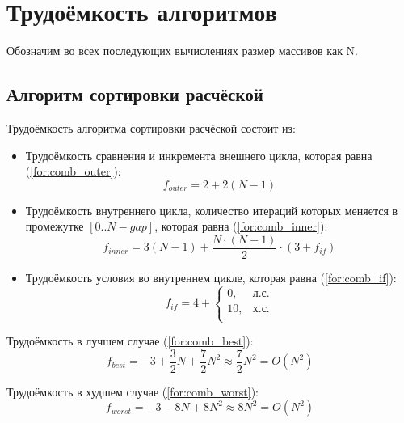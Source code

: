 \section{Трудоёмкость алгоритмов}

Обозначим во всех последующих вычислениях размер массивов как N.

\subsection{Алгоритм сортировки расчёской}

Трудоёмкость алгоритма сортировки расчёской состоит из:
\begin{itemize}
    \item Трудоёмкость сравнения и инкремента внешнего цикла, которая равна (\ref{for:comb_outer}):
        \begin{equation}
            \label{for:comb_outer}
            f_{outer} = 2 + 2(N - 1)
        \end{equation}
    \item Трудоёмкость внутреннего цикла, количество итераций которых меняется в промежутке $[0..N-gap]$, которая равна (\ref{for:comb_inner}):
        \begin{equation}
            \label{for:comb_inner}
            f_{inner} = 3(N - 1) + \frac{N \cdot (N - 1)}{2} \cdot (3 + f_{if})
        \end{equation}
    \item Трудоёмкость условия во внутреннем цикле, которая равна (\ref{for:comb_if}):
        \begin{equation}
            \label{for:comb_if}
            f_{if} = 4 + \begin{cases}
                0, & \text{л.с.}\\
                10, & \text{х.с.}\\
            \end{cases}
        \end{equation}
\end{itemize}

Трудоёмкость в лучшем случае (\ref{for:comb_best}):
\begin{equation}
    \label{for:comb_best}
    f_{best} = -3 + \frac{3}{2} N + \frac{7}{2} N^2 \approx \frac{7}{2} N^2 = O(N^2)
\end{equation}

Трудоёмкость в худшем случае (\ref{for:comb_worst}):
\begin{equation}
    \label{for:comb_worst}
    f_{worst} = -3 - 8N + 8N^2 \approx 8N^2 = O(N^2)
\end{equation}

